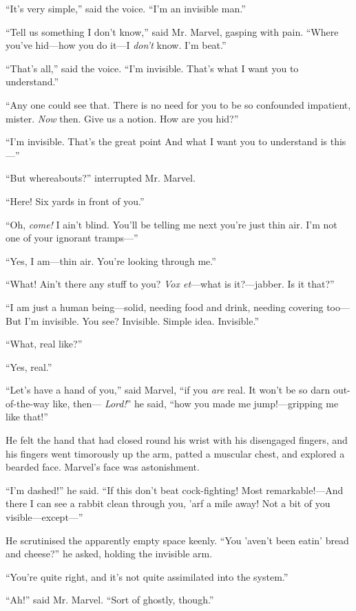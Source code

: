 “It’s very simple,” said the voice. “I’m an invisible man.”

“Tell us something I don’t know,” said Mr. Marvel, gasping with pain. “Where you’ve hid—how you do it—I \emph{don’t} know. I’m beat.”

“That’s all,” said the voice. “I’m invisible. That’s what I want you to understand.”

“Any one could see that. There is no need for you to be so confounded impatient, mister. \emph{Now} then. Give us a notion. How are you hid?”

“I’m invisible. That’s the great point And what I want you to understand is this—”

“But whereabouts?” interrupted Mr. Marvel.

“Here! Six yards in front of you.”

“Oh, \emph{come!} I ain’t blind. You’ll be telling me next you’re just thin air. I’m not one of your ignorant tramps—”

“Yes, I am—thin air. You’re looking through me.”

“What! Ain’t there any stuff to you? \emph{Vox et}—what is it?—jabber. Is it that?”

“I am just a human being—solid, needing food and drink, needing covering too— But I’m invisible. You see? Invisible. Simple idea. Invisible.”

“What, real like?”

“Yes, real.”

“Let’s have a hand of you,” said Marvel, “if you \emph{are} real. It won’t be so darn out-of-the-way like, then— \emph{Lord!}” he said, “how you made me jump!—gripping me like that!”

He felt the hand that had closed round his wrist with his disengaged fingers, and his fingers went timorously up the arm, patted a muscular chest, and explored a bearded face. Marvel’s face was astonishment.

“I’m dashed!” he said. “If this don’t beat cock-fighting! Most remarkable!—And there I can see a rabbit clean through you, ’arf a mile away! Not a bit of you visible—except—”

He scrutinised the apparently empty space keenly. “You ’aven’t been eatin’ bread and cheese?” he asked, holding the invisible arm.

“You’re quite right, and it’s not quite assimilated into the system.”

“Ah!” said Mr. Marvel. “Sort of ghostly, though.”

